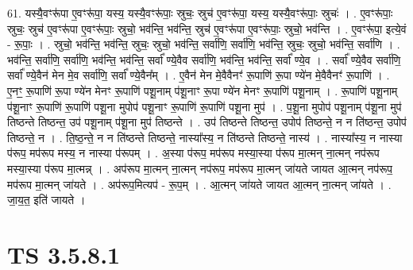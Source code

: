 \documentclass[17pt]{extarticle}
\begin{document}
61. यस्यै॒वꣳरू॑पा ए॒वꣳरू॑पा॒ यस्य॒ यस्यै॒वꣳरू॑पाः॒ स्रुचः॒ स्रुच॑ ए॒वꣳरू॑पा॒ यस्य॒ यस्यै॒वꣳरू॑पाः॒ स्रुचः॑ । . ए॒वꣳरू॑पाः॒ स्रुचः॒ स्रुच॑ ए॒वꣳरू॑पा ए॒वꣳरू॑पाः॒ स्रुचो॒ भव॑न्ति॒ भव॑न्ति॒ स्रुच॑ ए॒वꣳरू॑पा ए॒वꣳरू॑पाः॒ स्रुचो॒ भव॑न्ति । . ए॒वꣳरू॑पा॒ इत्ये॒वं - रू॒पाः॒ । . स्रुचो॒ भव॑न्ति॒ भव॑न्ति॒ स्रुचः॒ स्रुचो॒ भव॑न्ति॒ सर्वा॑णि॒ सर्वा॑णि॒ भव॑न्ति॒ स्रुचः॒ स्रुचो॒ भव॑न्ति॒ सर्वा॑णि । . भव॑न्ति॒ सर्वा॑णि॒ सर्वा॑णि॒ भव॑न्ति॒ भव॑न्ति॒ सर्वा᳚ ण्ये॒वैव सर्वा॑णि॒ भव॑न्ति॒ भव॑न्ति॒ सर्वा᳚ ण्ये॒व । . सर्वा᳚ ण्ये॒वैव सर्वा॑णि॒ सर्वा᳚ ण्ये॒वैन॑ मेन मे॒व सर्वा॑णि॒ सर्वा᳚ ण्ये॒वैन᳚म् । . ए॒वैन॑ मेन मे॒वैवैनꣳ॑ रू॒पाणि॑ रू॒पा ण्ये॑न मे॒वैवैनꣳ॑ रू॒पाणि॑ । . ए॒नꣳ॒॒ रू॒पाणि॑ रू॒पा ण्ये॑न मेनꣳ रू॒पाणि॑ पशू॒नाम् प॑शू॒नाꣳ रू॒पा ण्ये॑न मेनꣳ रू॒पाणि॑ पशू॒नाम् । . रू॒पाणि॑ पशू॒नाम् प॑शू॒नाꣳ रू॒पाणि॑ रू॒पाणि॑ पशू॒ना मुपोप॑ पशू॒नाꣳ रू॒पाणि॑ रू॒पाणि॑ पशू॒ना मुप॑ । . प॒शू॒ना मुपोप॑ पशू॒नाम् प॑शू॒ना मुप॑ तिष्ठन्ते तिष्ठन्त॒ उप॑ पशू॒नाम् प॑शू॒ना मुप॑ तिष्ठन्ते । . उप॑ तिष्ठन्ते तिष्ठन्त॒ उपोप॑ तिष्ठन्ते॒ न न ति॑ष्ठन्त॒ उपोप॑ तिष्ठन्ते॒ न । . ति॒ष्ठ॒न्ते॒ न न ति॑ष्ठन्ते तिष्ठन्ते॒ नास्या᳚स्य॒ न ति॑ष्ठन्ते तिष्ठन्ते॒ नास्य॑ । . नास्या᳚स्य॒ न नास्या प॑रूप॒ मप॑रूप मस्य॒ न नास्या प॑रूपम् । . अ॒स्या प॑रूप॒ मप॑रूप मस्या॒स्या प॑रूप मा॒त्मन् ना॒त्मन् नप॑रूप मस्या॒स्या प॑रूप मा॒त्मन्न् । . अप॑रूप मा॒त्मन् ना॒त्मन् नप॑रूप॒ मप॑रूप मा॒त्मन् जा॑यते जायत आ॒त्मन् नप॑रूप॒ मप॑रूप मा॒त्मन् जा॑यते । . अप॑रूप॒मित्यप॑ - रू॒प॒म् । . आ॒त्मन् जा॑यते जायत आ॒त्मन् ना॒त्मन् जा॑यते । . जा॒य॒त॒ इति॑ जायते । \newline
\pagebreak
{}

\section{ TS 3.5.8.1 }
\end{document}
